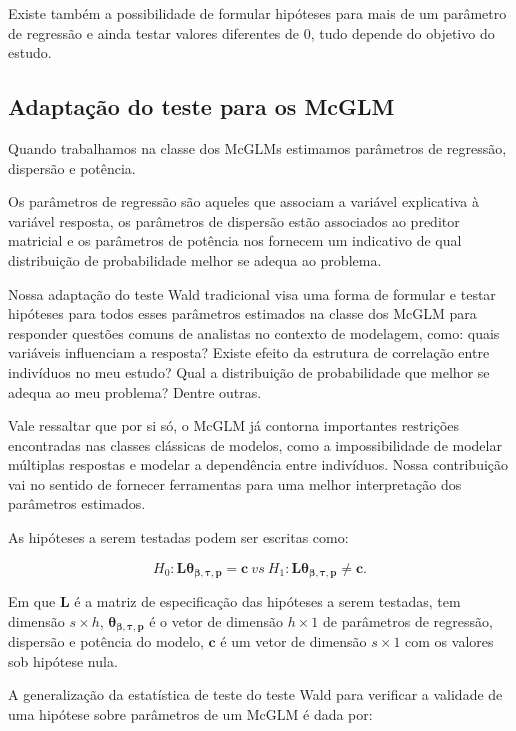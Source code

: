 Existe também a possibilidade de formular hipóteses para mais de um parâmetro de regressão e ainda testar valores diferentes de 0, tudo depende do objetivo do estudo.

\subsection{Adaptação do teste para os McGLM}

Quando trabalhamos na classe dos McGLMs estimamos parâmetros de regressão, dispersão e potência. 

Os parâmetros de regressão são aqueles que associam a variável explicativa à variável resposta, os parâmetros de dispersão estão associados ao preditor matricial e os parâmetros de potência nos fornecem um indicativo de qual distribuição de probabilidade melhor se adequa ao problema. 

Nossa adaptação do teste Wald tradicional visa uma forma de formular e testar hipóteses para todos esses parâmetros estimados na classe dos McGLM para responder questões comuns de analistas no contexto de modelagem, como: quais variáveis influenciam a resposta? Existe efeito da estrutura de correlação entre indivíduos no meu estudo? Qual a distribuição de probabilidade que melhor se adequa ao meu problema? Dentre outras.

Vale ressaltar que por si só, o McGLM já contorna importantes restrições encontradas nas classes clássicas de modelos, como a impossibilidade de modelar múltiplas respostas e modelar a dependência entre indivíduos. Nossa contribuição vai no sentido de fornecer ferramentas para uma melhor interpretação dos parâmetros estimados.

As hipóteses a serem testadas podem ser escritas como:

\begin{equation}
H_0: \boldsymbol{L}\boldsymbol{\theta_{\beta,\tau,p}} = \boldsymbol{c} \ vs \ H_1: \boldsymbol{L}\boldsymbol{\theta_{\beta,\tau,p}} \neq \boldsymbol{c}. 
\end{equation}

\noindent Em que $\boldsymbol{L}$ é a matriz de especificação das hipóteses a serem testadas, tem dimensão $s \times h$, $\boldsymbol{\theta_{\beta,\tau,p}}$ é o vetor de dimensão $h \times 1$ de parâmetros de regressão, dispersão e potência do modelo, $\boldsymbol{c}$ é um vetor de dimensão $s \times 1$ com os valores sob hipótese nula.

A generalização da estatística de teste do teste Wald para verificar a validade de uma hipótese sobre parâmetros de um McGLM é dada por:

